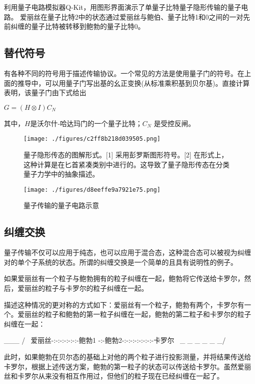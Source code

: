 利用量子电路模拟器Q-Kit，用图形界面演示了单量子比特量子隐形传输的量子电路。 爱丽丝在量子比特2中的状态通过爱丽丝与鲍伯、量子比特1和0之间的一对先前纠缠的量子比特被转移到鲍勃的量子比特0。

\subsection{替代符号}

有各种不同的符号用于描述传输协议。一个常见的方法是使用量子门的符号。在上面的推导中，可以用量子门写出基的幺正变换(从标准乘积基到贝尔基)。直接计算表明，该量子门由下式给出

$G=(H\otimes I)C_N$

其中，$H$是沃尔什-哈达玛门的一个量子比特；$C_N$ 是受控反闸。

\begin{figure}[ht]
\centering
\texttt{[image: ./figures/c2ff8b218d039505.png]}
\caption{量子隐形传态的图解形式。[1] 采用彭罗斯图形符号。[2] 在形式上，这种计算是在匕首紧凑类别中进行的。这导致了量子隐形传态在分类量子力学中的抽象描述。} \label{fig_LZYXCT_5}
\end{figure}

\begin{figure}[ht]
\centering
\texttt{[image: ./figures/d8eeffe9a7921e75.png]}
\caption{量子传输的量子电路示意} \label{fig_LZYXCT_6}
\end{figure}

\subsection{纠缠交换}

量子传输不仅可以应用于纯态，也可以应用于混合态，这种混合态可以被视为纠缠对的单个子系统的状态。所谓的纠缠交换是一个简单的且具有说明性的例子。

如果爱丽丝有一个粒子与鲍勃拥有的粒子纠缠在一起，鲍勃将它传送给卡罗尔，然后，爱丽丝的粒子与卡罗尔的粒子纠缠在一起。

描述这种情况的更对称的方式如下：爱丽丝有一个粒子，鲍勃有两个，卡罗尔有一个。爱丽丝的粒子和鲍勃的第一粒子纠缠在一起，鲍勃的第二粒子和卡罗尔的粒子纠缠在一起：

        ___
                     /   \
 爱丽丝-:-:-:-:-:-:-鲍勃1 -:-鲍勃2-:-:-:-:-:-:-:-卡罗尔
                     \ _ _ _ _ _ _/

                     此时，如果鲍勃在贝尔态的基础上对他的两个粒子进行投影测量，并将结果传送给卡罗尔，根据上述传送方案，鲍勃的第一粒子的状态可以传送给卡罗尔。虽然爱丽丝和卡罗尔从来没有相互作用过，但他们的粒子现在已经纠缠在一起了。

